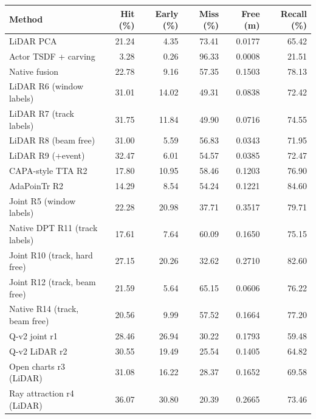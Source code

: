 \begin{tabular}{lrrrrr}
\toprule
Method & Hit (\%) & Early (\%) & Miss (\%) & Free (m) & Recall (\%) \\
\midrule
LiDAR PCA & 21.24 & 4.35 & 73.41 & 0.0177 & 65.42 \\
Actor TSDF + carving & 3.28 & 0.26 & 96.33 & 0.0008 & 21.51 \\
Native fusion & 22.78 & 9.16 & 57.35 & 0.1503 & 78.13 \\
LiDAR R6 (window labels) & 31.01 & 14.02 & 49.31 & 0.0838 & 72.42 \\
LiDAR R7 (track labels) & 31.75 & 11.84 & 49.90 & 0.0716 & 74.55 \\
LiDAR R8 (beam free) & 31.00 & 5.59 & 56.83 & 0.0343 & 71.95 \\
LiDAR R9 (+event) & 32.47 & 6.01 & 54.57 & 0.0385 & 72.47 \\
CAPA-style TTA R2 & 17.80 & 10.95 & 58.46 & 0.1203 & 76.90 \\
AdaPoinTr R2 & 14.29 & 8.54 & 54.24 & 0.1221 & 84.60 \\
Joint R5 (window labels) & 22.28 & 20.98 & 37.71 & 0.3517 & 79.71 \\
Native DPT R11 (track labels) & 17.61 & 7.64 & 60.09 & 0.1650 & 75.15 \\
Joint R10 (track, hard free) & 27.15 & 20.26 & 32.62 & 0.2710 & 82.60 \\
Joint R12 (track, beam free) & 21.59 & 5.64 & 65.15 & 0.0606 & 76.22 \\
Native R14 (track, beam free) & 20.56 & 9.99 & 57.52 & 0.1664 & 77.20 \\
Q-v2 joint r1 & 28.46 & 26.94 & 30.22 & 0.1793 & 59.48 \\
Q-v2 LiDAR r2 & 30.55 & 19.49 & 25.54 & 0.1405 & 64.82 \\
Open charts r3 (LiDAR) & 31.08 & 16.22 & 28.37 & 0.1652 & 69.58 \\
Ray attraction r4 (LiDAR) & 36.07 & 30.80 & 20.39 & 0.2665 & 73.46 \\
\bottomrule
\end{tabular}
